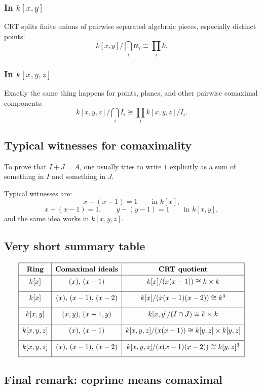 \documentclass[12pt,a4paper]{article}
\theoremstyle{notespace}
\begin{document}
\subsubsection*{In \(k[x,y]\)}
CRT splits finite unions of pairwise separated algebraic pieces, especially distinct points:
\[
k[x,y]/\bigcap_i \mathfrak m_i \cong \prod_i k.
\]

\subsubsection*{In \(k[x,y,z]\)}
Exactly the same thing happens for points, planes, and other pairwise comaximal components:
\[
k[x,y,z]/\bigcap_i I_i \cong \prod_i k[x,y,z]/I_i.
\]

\subsection{Typical witnesses for comaximality}

To prove that \(I+J=A\), one usually tries to write \(1\) explicitly as a sum of something in \(I\) and something in \(J\).

Typical witnesses are:
\[
x-(x-1)=1
\qquad \text{in } k[x],
\]
\[
x-(x-1)=1,\qquad y-(y-1)=1
\qquad \text{in } k[x,y],
\]
and the same idea works in \(k[x,y,z]\).

\subsection{Very short summary table}

\[
\renewcommand{\arraystretch}{1.4}
\begin{array}{|c|c|c|}
	\hline
	\textbf{Ring} & \textbf{Comaximal ideals} & \textbf{CRT quotient} \\
	\hline
	k[x] & (x),\,(x-1)
	& k[x]/(x(x-1))\cong k\times k \\[2mm]
	\hline
	k[x] & (x),\,(x-1),\,(x-2)
	& k[x]/(x(x-1)(x-2))\cong k^3 \\[2mm]
	\hline
	k[x,y] & (x,y),\,(x-1,y)
	& k[x,y]/(I\cap J)\cong k\times k \\[2mm]
	\hline
	k[x,y,z] & (x),\,(x-1)
	& k[x,y,z]/(x(x-1))\cong k[y,z]\times k[y,z] \\[2mm]
	\hline
	k[x,y,z] & (x),\,(x-1),\,(x-2)
	& k[x,y,z]/(x(x-1)(x-2))\cong k[y,z]^3 \\[2mm]
	\hline
\end{array}
\]

\subsection{Final remark: coprime means comaximal}
\end{document}
